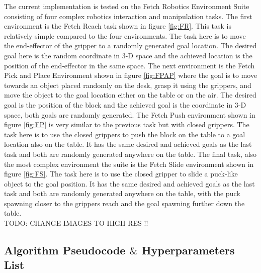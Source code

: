 The current implementation is tested on the Fetch Robotics Environment Suite consisting of four complex robotics interaction and manipulation tasks. The first environment is the Fetch Reach task shown in figure \ref{fig:FR}. This task is relatively simple compared to the four environments. The task here is to move the end-effector of the gripper to a randomly generated goal location. The desired goal here is the random coordinate in 3-D space and the achieved location is the position of the end-effector in the same space. The next environment is the Fetch Pick and Place Environment shown in figure \ref{fig:FPAP} where the goal is to move towards an object placed randomly on the desk, grasp it using the grippers, and move the object to the goal location either on the table or on the air. The desired goal is the position of the block and the achieved goal is the coordinate in 3-D space, both goals are randomly generated. The Fetch Push environment shown in figure \ref{fig:FP} is very similar to the previous task but with closed grippers. The task here is to use the closed grippers to push the block on the table to a goal location also on the table. It has the same desired and achieved goals as the last task and both are randomly generated anywhere on the table. The final task, also the most complex environment the suite is the Fetch Slide environment shown in figure \ref{fig:FS}. The task here is to use the closed gripper to slide a puck-like object to the goal position. It has the same desired and achieved goals as the last task and both are randomly generated anywhere on the table, with the puck spawning closer to the grippers reach and the goal spawning further down the table. \\

TODO: CHANGE IMAGES TO HIGH RES !! \\

\subsection{Algorithm Pseudocode $\&$ Hyperparameters List}

